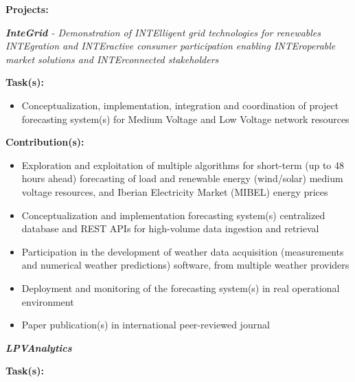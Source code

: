 \documentclass{mycv}
\begin{document}
\vspace{0.4cm}

\textbf{Projects:}
\vspace{0.1cm}

\begin{myitemize}	
	\item \textit{\textbf{InteGrid} - Demonstration of INTElligent grid technologies for renewables INTEgration and INTEractive consumer participation enabling INTEroperable market solutions and INTErconnected stakeholders}
	
		\vspace{0.4cm}
		\textbf{Task(s):}
		
		\begin{itemize}[itemsep=1px]
		\item Conceptualization, implementation, integration and coordination of project forecasting system(s) for Medium Voltage and Low Voltage network resources
		\end{itemize}
	
		\vspace{0.2cm}
		\textbf{Contribution(s):}
		
		\begin{itemize}[itemsep=1px]
		\item Exploration and exploitation of multiple algorithms for short-term (up to 48 hours ahead) forecasting of load and renewable energy (wind/solar) medium voltage resources, and Iberian Electricity Market (MIBEL) energy prices
		\item Conceptualization and implementation forecasting system(s) centralized database and REST APIs for high-volume data ingestion and retrieval
		\item Participation in the development of weather data acquisition (measurements and numerical weather predictions) software, from multiple weather providers
		\item Deployment and monitoring of the forecasting system(s) in real operational environment
		\item Paper publication(s) in international peer-reviewed journal
		\end{itemize}
	
	
	\vspace{0.6cm}	
	
	\item \textit{\textbf{LPVAnalytics}}
	
		\vspace{0.4cm}
		\textbf{Task(s):}
		

\end{myitemize}
\end{document}
